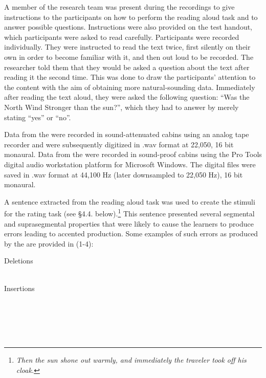 \documentclass[output=paper]{langsci/langscibook}
\begin{document}
A member of the research team was present during the recordings to give instructions to the participants on how to perform the reading aloud task and to answer possible questions. Instructions were also provided on the test handout, which participants were asked to read carefully. Participants were recorded individually. They were instructed to read the text twice, first silently on their own in order to become familiar with it, and then out loud to be recorded. The researcher told them that they would be asked a question about the text after reading it the second time. This was done to draw the participants’ attention to the content with the aim of obtaining more natural-sounding data. Immediately after reading the text aloud, they were asked the following question: “Was the North Wind Stronger than the sun?”, which they had to answer by merely stating “yes” or “no”.

Data from the  were recorded in sound-attenuated cabins using an analog tape recorder and were subsequently digitized in .wav format at 22,050, 16 bit monaural. Data from the  were recorded in sound-proof cabins using the Pro Tools digital audio workstation platform for Microsoft Windows. The digital files were saved in .wav format at 44,100 Hz (later downsampled to 22,050 Hz), 16 bit monaural.

A sentence extracted from the reading aloud task was used to create the stimuli for the rating task (see §4.4. below).\footnote{\textit{Then the sun shone out warmly, and immediately the traveler took off his cloak.}} This sentence presented several segmental and suprasegmental properties that were likely to cause the  learners to produce  errors leading to accented  production. Some examples of such  errors as produced by the  are provided in (1-4): 

\ea
{Deletions} 
  \\
  \\
  \z
\z

\ea
{Insertions}
  \z
\z

  \\
  \\
  \\
  \\
  \z
\z
\end{document}
